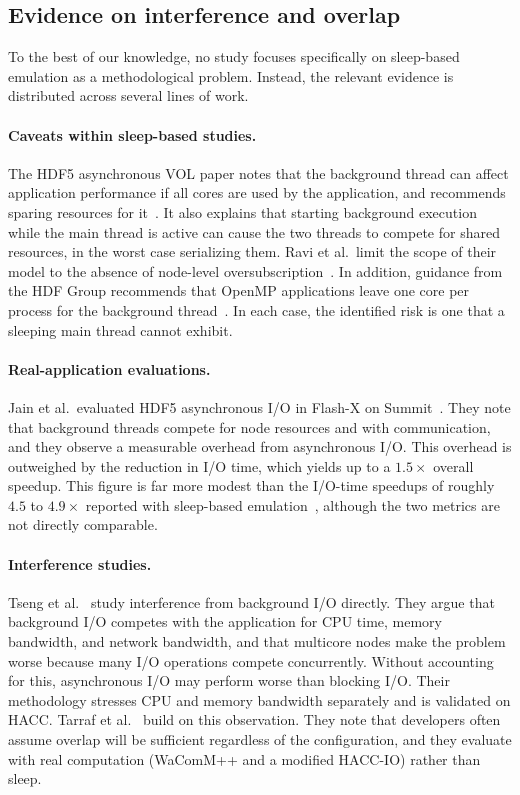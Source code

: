 \subsection{Evidence on interference and overlap}

To the best of our knowledge, no study focuses specifically on sleep-based
emulation as a methodological problem. Instead, the relevant evidence is
distributed across several lines of work.

\paragraph{Caveats within sleep-based studies.} The HDF5 asynchronous VOL
paper notes that the background thread can affect application performance
if all cores are used by the application, and recommends sparing resources
for it~\cite{tang2022async}. It also explains that starting background
execution while the main thread is active can cause the two threads to
compete for shared resources, in the worst case serializing them. Ravi et
al.\ limit the scope of their model to the absence of node-level
oversubscription~\cite{ravi2023evaluating}. In addition, guidance from the
HDF Group recommends that OpenMP applications leave one core per process for
the background thread~\cite{hdfgroup2022sc}. In each case, the identified
risk is one that a sleeping main thread cannot exhibit.

\paragraph{Real-application evaluations.} Jain et al.\ evaluated HDF5
asynchronous I/O in Flash-X on Summit~\cite{jain2022flashx}. They note that
background threads compete for node resources and with communication, and
they observe a measurable overhead from asynchronous I/O. This overhead is
outweighed by the reduction in I/O time, which yields up to a $1.5\times$
overall speedup. This figure is far more modest than the I/O-time speedups of
roughly $4.5$ to $4.9\times$ reported with sleep-based
emulation~\cite{tang2022async}, although the two metrics are not directly
comparable.

\paragraph{Interference studies.} Tseng et al.~\cite{tseng2021demystifying}
study interference from background I/O directly. They argue that background
I/O competes with the application for CPU time, memory bandwidth, and
network bandwidth, and that multicore nodes make the problem worse because
many I/O operations compete concurrently. Without accounting for this,
asynchronous I/O may perform worse than blocking I/O. Their methodology
stresses CPU and memory bandwidth separately and is validated on HACC.
Tarraf et al.~\cite{tarraf2024behind} build on this observation. They note
that developers often assume overlap will be sufficient regardless of the
configuration, and they evaluate with real computation (WaComM++ and a
modified HACC-IO) rather than sleep.

